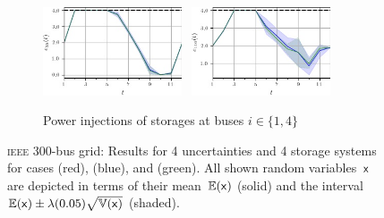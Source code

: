 \documentclass[final,3p,times,twocolumn]{elsarticle}  %
\begin{document}
\begin{figure}
    \begin{subfigure}[c]{\figwidth}
    \centering
    	\includegraphics[width=0.45\textwidth]{figures/time series/case300_volatile/storage_e_4651.jpg}~
    	\includegraphics[width=0.45\textwidth]{figures/time series/case300_volatile/storage_e_4654.jpg}%
    	\vspace{-2mm}	
    	\caption{Power injections of storages at buses $i \in \{1,4\}$}
    \end{subfigure}
    
    
    \vspace{2mm}	
	\vspace{\adjustlength}
	\caption{\textsc{ieee} 300-bus grid: Results for 4 uncertainties and 4 storage systems for cases \caseNoStorage (red), \caseStorage (blue), and \caseStorageWithVariance (green). All shown random variables~$\mathsf{x}$ are depicted in terms of their mean~$\mathbb{E}(\mathsf{x})$ (solid) and the interval $\mathbb{E}(\mathsf{x}) \pm \lambda (0.05) \sqrt{\mathbb{V}(\mathsf{x})}$ (shaded).}
\end{figure}
\end{document}
